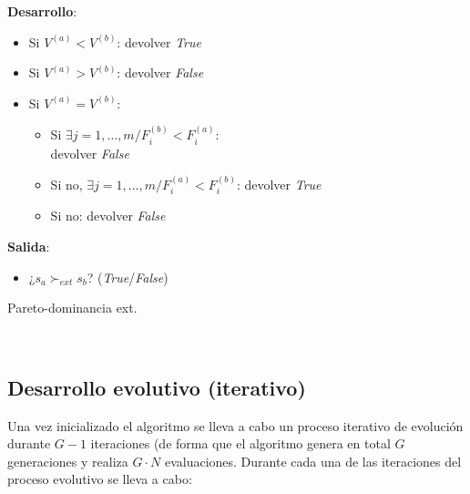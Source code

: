 \begin{itemize}
\begin{center}
\begin{minipage}[H]{0.5\linewidth}
\begin{algorithm}[H]
 \vspace{0.3cm}
  
 \textbf{Desarrollo}:\\
        \begin{itemize}
        	\vspace{0.15cm}\item Si $V^{(a)} < V^{(b)}$: devolver \textit{True}
        	\vspace{0.15cm}\item Si $V^{(a)} > V^{(b)}$: devolver \textit{False}
        	\vspace{0.15cm}\item Si $V^{(a)} = V^{(b)}$: 
        	\begin{itemize}
        		\vspace{0.15cm}\item Si $\exists j=1, \dots, m / F_i^{(b)} < F_i^{(a)}$:\\devolver \textit{False} 
            	\vspace{0.15cm}\item Si no, $\exists j=1, \dots, m / F_i^{(a)} < F_i^{(b)}$: devolver \textit{True} 
            	\vspace{0.15cm}\item Si no: devolver \textit{False}
        	\end{itemize}
        \end{itemize}
    \vspace{0.3cm} 
    
    \textbf{Salida}:
    \begin{itemize}
        \item ¿$ s_a \succ_{ext} s_b$? (\textit{True}/\textit{False})
    \end{itemize}
 \caption{Pareto-dominancia ext.}
 \label{alg:3}
\end{algorithm}
\end{minipage}\\
\end{center}

\end{itemize}

\subsection{Desarrollo evolutivo (iterativo)}

Una vez inicializado el algoritmo se lleva a cabo un proceso iterativo de evolución durante $G-1$ iteraciones (de forma que el algoritmo genera en total $G$ generaciones y realiza $G \cdot N$ evaluaciones. Durante cada una de las iteraciones del proceso evolutivo se lleva a cabo:

